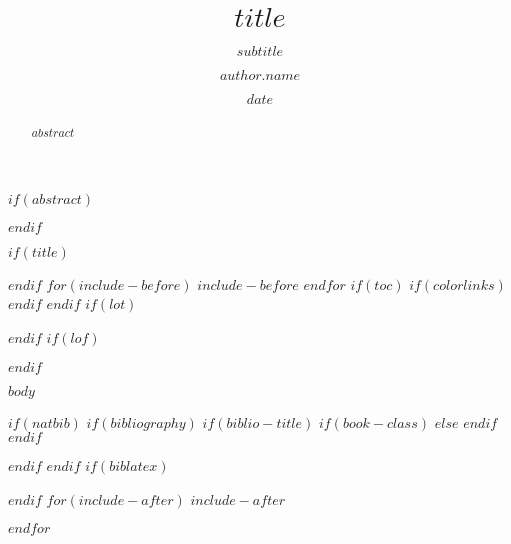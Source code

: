 \documentclass[$if(fontsize)$$fontsize$,$endif$$if(lang)$$babel-lang$,$endif$$if(papersize)$$papersize$,$endif$$for(classoption)$$classoption$$sep$,$endfor$]{$documentclass$}
\title{$title$}
\subtitle{$subtitle$}
\author{$author.name$}
\affiliation{\institution{$author.affiliation$}}
\date{$date$}
\begin{document}
$if(abstract)$
\begin{abstract}
$abstract$
\end{abstract}
$endif$

$if(title)$
\maketitle
$endif$
$for(include-before)$
$include-before$
$endfor$
$if(toc)$
{
$if(colorlinks)$
\hypersetup{linkcolor=$if(toccolor)$$toccolor$$else$black$endif$}
$endif$
\setcounter{tocdepth}{$toc-depth$}
\tableofcontents
}
$endif$
$if(lot)$
\listoftables
$endif$
$if(lof)$
\listoffigures
$endif$


$body$

\fi
$if(natbib)$
$if(bibliography)$
$if(biblio-title)$
$if(book-class)$
\renewcommand\bibname{$biblio-title$}
$else$
\renewcommand\refname{$biblio-title$}
$endif$
$endif$
{\small\balance}

$endif$
$endif$
$if(biblatex)$

$endif$
$for(include-after)$
$include-after$

$endfor$
\end{document}
